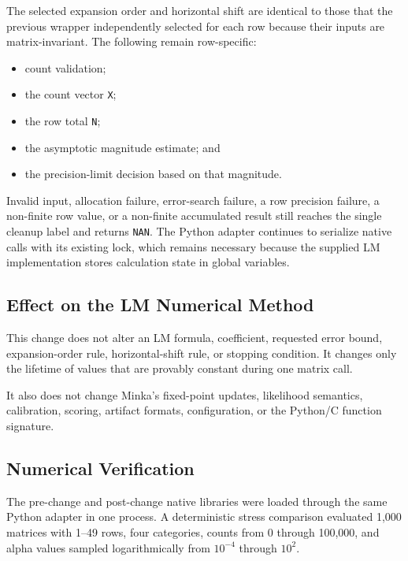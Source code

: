 \documentclass[11pt,a4paper]{article}
\begin{document}
The selected expansion order and horizontal shift are identical to those that
the previous wrapper independently selected for each row because their inputs
are matrix-invariant. The following remain row-specific:

\begin{itemize}

\item count validation;

\item the count vector \texttt{X};

\item the row total \texttt{N};

\item the asymptotic magnitude estimate; and

\item the precision-limit decision based on that magnitude.

\end{itemize}

Invalid input, allocation failure, error-search failure, a row precision
failure, a non-finite row value, or a non-finite accumulated result still
reaches the single cleanup label and returns \texttt{NAN}. The Python adapter
continues to serialize native calls with its existing lock, which remains
necessary because the supplied LM implementation stores calculation state in
global variables.

\subsection{Effect on the LM Numerical Method}

This change does not alter an LM formula, coefficient, requested error bound,
expansion-order rule, horizontal-shift rule, or stopping condition. It changes
only the lifetime of values that are provably constant during one matrix call.

It also does not change Minka's fixed-point updates, likelihood semantics,
calibration, scoring, artifact formats, configuration, or the Python/C
function signature.

\subsection{Numerical Verification}

The pre-change and post-change native libraries were loaded through the same
Python adapter in one process. A deterministic stress comparison evaluated
1,000 matrices with 1--49 rows, four categories, counts from 0 through 100,000,
and alpha values sampled logarithmically from \(10^{-4}\) through \(10^2\).
\end{document}
